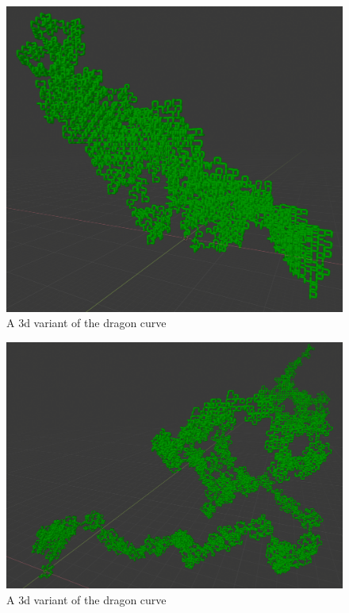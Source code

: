 \begin{figure}[h]
    \centering
    \includegraphics[width=\textwidth]{figures/L-systems/dragon0-3d.png}
    \caption{A 3d variant of the dragon curve}
\end{figure}

\begin{figure}[h]
    \centering
    \includegraphics[width=\textwidth]{figures/L-systems/dragon1-3d.png}
    \caption{A 3d variant of the dragon curve}
\end{figure}

